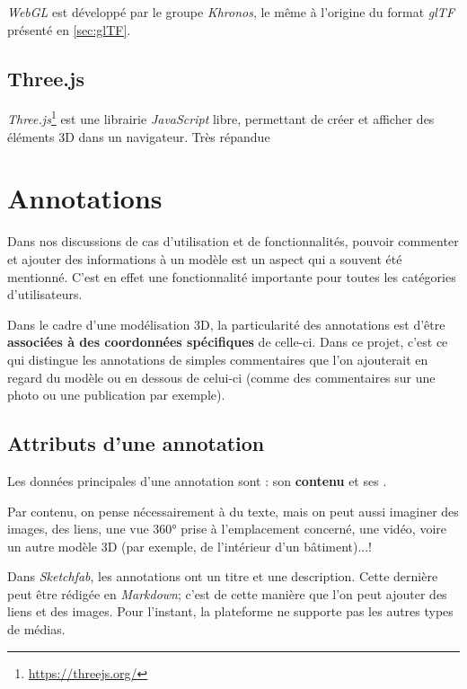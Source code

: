 \textit{WebGL} est développé par le groupe \textit{Khronos}, le même à l'origine du format \textit{glTF} présenté en \ref{sec:glTF}.


\subsection{Three.js}
\textit{Three.js}\footnote{\url{https://threejs.org/}} est une librairie \textit{JavaScript} libre, permettant de créer et afficher des éléments 3D dans un navigateur. Très répandue




\section{Annotations}

Dans nos discussions de cas d'utilisation et de fonctionnalités, pouvoir commenter et ajouter des informations à un modèle est un aspect qui a souvent été mentionné. C'est en effet une fonctionnalité importante pour toutes les catégories d'utilisateurs.

Dans le cadre d'une modélisation 3D, la particularité des annotations est d'être \textbf{associées à des coordonnées spécifiques} de celle-ci. Dans ce projet, c'est ce qui distingue les annotations de simples commentaires que l'on ajouterait en regard du modèle ou en dessous de celui-ci (comme des commentaires sur une photo ou une publication par exemple).

\subsection{Attributs d'une annotation}
Les données principales d'une annotation sont : son \textbf{contenu} et ses .

Par contenu, on pense nécessairement à du texte, mais on peut aussi imaginer des images, des liens, une vue 360° prise à l'emplacement concerné, une vidéo, voire un autre modèle 3D (par exemple, de l'intérieur d'un bâtiment)...!

Dans \textit{Sketchfab}, les annotations ont un titre et une description. Cette dernière peut être rédigée en \textit{Markdown}; c'est de cette manière que l'on peut ajouter des liens et des images. Pour l'instant, la plateforme ne supporte pas les autres types de médias.

